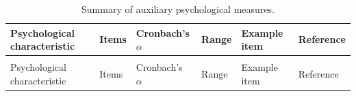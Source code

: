 \documentclass[
  letterpaper,
  DIV=11,
  numbers=noendperiod]{scrartcl}
\begin{document}
\begin{landscape}\begingroup\fontsize{7}{9}\selectfont

\begin{longtable}[t]{>{\raggedright\arraybackslash}p{20em}>{\raggedright\arraybackslash}p{3.5em}>{\raggedright\arraybackslash}p{6em}>{\raggedright\arraybackslash}p{3.5em}>{\raggedright\arraybackslash}p{30em}>{\raggedright\arraybackslash}p{13em}}

\caption{\label{tbl-scales}Summary of auxiliary psychological measures.}

\tabularnewline

\toprule
Psychological characteristic & Items & Cronbach's $\alpha$ & Range & Example item & Reference\\
\midrule
\endfirsthead
\multicolumn{6}{@{}l}{\textit{(continued)}}\\
\toprule
Psychological characteristic & Items & Cronbach's $\alpha$ & Range & Example item & Reference\\
\midrule
\endhead


\end{longtable}
\end{landscape}
\end{document}
